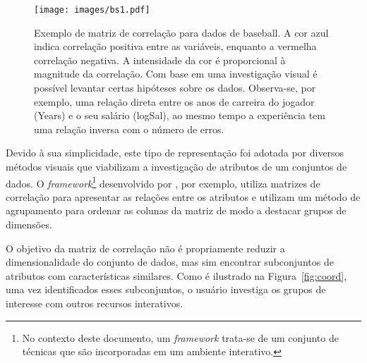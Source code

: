 \begin{figure}[h!]
    \centering
    \texttt{[image: images/bs1.pdf]}
    \caption[Matrizes de Correlação]{Exemplo de matriz de correlação para dados de baseball. A cor azul indica correlação positiva entre as variáveis, enquanto a vermelha correlação negativa. A intensidade da cor é proporcional à magnitude da correlação. Com base em uma investigação visual é possível levantar certas hipóteses sobre os dados. Observa-se, por exemplo, uma relação direta entre os anos de carreira do jogador (Years) e o seu salário (logSal), ao mesmo tempo a experiência tem uma relação inversa com o número de erros.} 
    \label{fig:bs1}
\end{figure}

Devido à sua simplicidade, este tipo de representação foi adotada por diversos métodos visuais que viabilizam a investigação de atributos de um conjuntos de dados. O \emph{framework}\footnote{No contexto deste documento, um \emph{framework} trata-se de um conjunto de técnicas que são incorporadas em um ambiente interativo.} desenvolvido por \cite{Guo2003}, por exemplo, utiliza matrizes de correlação para apresentar as relações entre os atributos e utilizam um método de agrupamento para ordenar as colunas da matriz de modo a destacar grupos de dimensões.

O objetivo da matriz de correlação não é propriamente reduzir a dimensionalidade do conjunto de dados, mas sim encontrar subconjuntos de atributos com características similares.
Como é ilustrado na Figura~\ref{fig:coord}, uma vez identificados esses subconjuntos, o usuário investiga os grupos de interesse com outros recursos interativos. 

